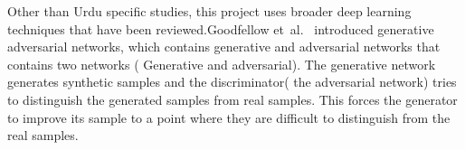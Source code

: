 \documentclass[12pt,a4paper]{report}
\begin{document}
Other than Urdu specific studies, this project uses broader deep learning techniques that have been reviewed.Goodfellow et~al.\ \cite{goodfellow2014} introduced generative adversarial networks, which contains generative and adversarial networks that contains two networks ( Generative and adversarial). The generative network generates synthetic samples and the discriminator( the adversarial network) tries to distinguish the generated samples from real samples. This forces the generator to improve its sample to a point where they are difficult to distinguish from the real samples.
\end{document}
